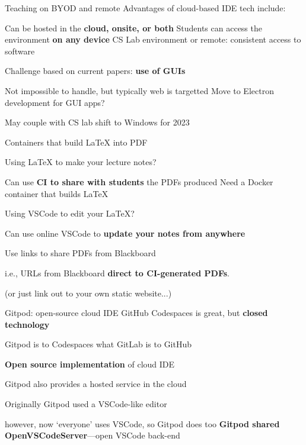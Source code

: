 \documentclass[aspectratio=169,t]{beamer}
\begin{document}
\begin{dframe}{Teaching on BYOD and remote}
  \1 Advantages of cloud-based IDE tech include:
  
  \2 Can be hosted in the \textbf{cloud, onsite, or both}
  \2 Students can access the environment \textbf{on any device}
  \2 CS Lab environment or remote: consistent access to software

  \medskip

  \1 Challenge based on current papers: \textbf{use of GUIs}
  
  \2 Not impossible to handle, but typically web is targetted
  \2 Move to Electron development for GUI apps?

  \medskip

  \1 May couple with CS lab shift to Windows for 2023
\end{dframe}

\begin{dframe}{Containers that build \LaTeX{} into PDF}

  \1 Using \LaTeX{} to make your lecture notes?
  
  \2 Can use \textbf{CI to share with students} the PDFs produced
  \2 Need a Docker container that builds \LaTeX{}
  
  \medskip
  
  \1 Using VSCode to edit your \LaTeX{}?
  
  \2 Can use online VSCode to \textbf{update your notes from anywhere}
  
  
  \medskip

  \1 Use links to share PDFs from Blackboard
 
  \2 i.e., URLs from Blackboard \textbf{direct to CI-generated PDFs}.

  \2 (or just link out to your own static website...)

\end{dframe}


\begin{dframe}{Gitpod: open-source cloud IDE}
  \1 GitHub Codespaces is great, but \textbf{closed technology}

  \bigskip
  \1 Gitpod is to Codespaces what GitLab is to GitHub
  
  \2 \textbf{Open source implementation} of cloud IDE

  
  \2 Gitpod also provides a hosted service in the cloud
  
  \bigskip
  \1 Originally Gitpod used a VSCode-like editor
  
  \2 however, now `everyone' uses VSCode, so Gitpod does too
  \2 \textbf{Gitpod shared OpenVSCodeServer}---open VSCode back-end
\end{dframe}
\end{document}
